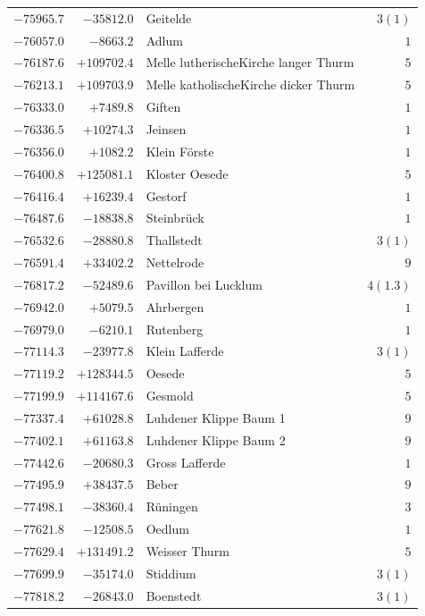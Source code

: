 \begin{center}
\begin{tabular}{r|r|p{170pt}|r}
\(-75965.7\)&\(-35812.0\)&Geitelde&\(3 (1)\)\\
\(-76057.0\)&\(-8663.2\)&Adlum&\(1\)\\
\(-76187.6\)&\(+109702.4\)&Melle lutherischeKirche langer Thurm&\(5\)\\
\(-76213.1\)&\(+109703.9\)&Melle katholischeKirche dicker Thurm&\(5\)\\
\(-76333.0\)&\(+7489.8\)&Giften&\(1\)\\
\(-76336.5\)&\(+10274.3\)&Jeinsen&\(1\)\\
\(-76356.0\)&\(+1082.2\)&Klein Förste&\(1\)\\
\(-76400.8\)&\(+125081.1\)&Kloster Oesede&\(5\)\\
\(-76416.4\)&\(+16239.4\)&Gestorf&\(1\)\\
\(-76487.6\)&\(-18838.8\)&Steinbrück&\(1\)\\
\(-76532.6\)&\(-28880.8\)&Thallstedt&\(3 (1)\)\\
\(-76591.4\)&\(+33402.2\)&Nettelrode&\(9\)\\
\(-76817.2\)&\(-52489.6\)&Pavillon bei Lucklum&\(4(1.3)\)\\
\(-76942.0\)&\(+5079.5\)&Ahrbergen&\(1\)\\
\(-76979.0\)&\(-6210.1\)&Rutenberg&\(1\)\\
\(-77114.3\)&\(-23977.8\)&Klein Lafferde&\(3 (1)\)\\
\(-77119.2\)&\(+128344.5\)&Oesede&\(5\)\\
\(-77199.9\)&\(+114167.6\)&Gesmold&\(5\)\\
\(-77337.4\)&\(+61028.8\)&Luhdener Klippe Baum 1&\(9\)\\
\(-77402.1\)&\(+61163.8\)&Luhdener Klippe Baum 2&\(9\)\\
\(-77442.6\)&\(-20680.3\)&Gross Lafferde&\(1\)\\
\(-77495.9\)&\(+38437.5\)&Beber&\(9\)\\
\(-77498.1\)&\(-38360.4\)&Rüningen&\(3\)\\
\(-77621.8\)&\(-12508.5\)&Oedlum&\(1\)\\
\(-77629.4\)&\(+131491.2\)&Weisser Thurm&\(5\)\\
\(-77699.9\)&\(-35174.0\)&Stiddium&\(3 (1)\)\\
\(-77818.2\)&\(-26843.0\)&Boenstedt&\(3 (1)\)\\
\hline\end{tabular}\endgroup\end{center}
\clearpage
